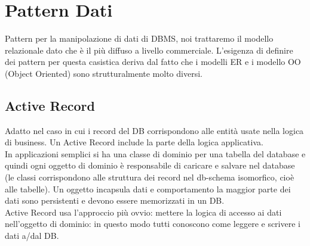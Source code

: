 \section{Pattern Dati}
Pattern per la manipolazione di dati di DBMS, noi trattaremo il modello relazionale dato
che è il più diffuso a livello commerciale. L'esigenza di definire dei pattern per questa casistica
deriva dal fatto che i modelli ER e i modello OO (Object Oriented) sono strutturalmente molto diversi.
\subsection{Active Record}
Adatto nel caso in cui i record del DB corrispondono alle entità usate nella logica di business.
Un Active Record include la parte della logica applicativa.\\
In applicazioni semplici si ha una classe di dominio per una tabella del database e quindi ogni
oggetto di dominio è responsabile di caricare e salvare nel database (le classi corrispondono alle struttura
dei record nel db-schema isomorfico, cioè alle tabelle). Un oggetto incapsula dati e comportamento
la maggior parte dei dati sono persistenti e devono essere memorizzati in un DB.\\
Active Record usa l'approccio più ovvio: mettere la logica di accesso ai dati nell'oggetto di dominio:
in questo modo tutti conoscono come leggere e scrivere i dati a/dal DB.
